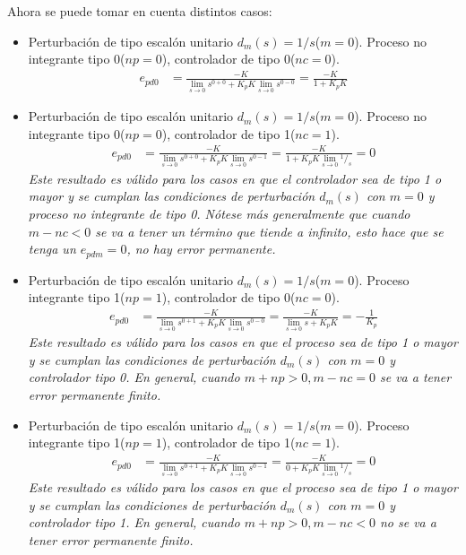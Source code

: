 \begin{ejercicio}
\begin{enumerate}
    Ahora se puede tomar en cuenta distintos casos:
    \begin{itemize}
      \item Perturbación de tipo escalón unitario $d_m(s)=1/s$($m=0$). Proceso no integrante tipo 0($np=0$), controlador de tipo 0($nc=0$).
      \begin{align*}
        e_{pd0} &= \frac{-K}
        {\lim_{s\rightarrow 0}s^{0+0} + K_p K\lim_{s\rightarrow 0} s^{0-0}}
        = \frac{-K}{1 + K_p K}
      \end{align*}

      \item Perturbación de tipo escalón unitario $d_m(s)=1/s$($m=0$). Proceso no integrante tipo 0($np=0$), controlador de tipo 1($nc=1$).
      \begin{align*}
        e_{pd0} &= \frac{-K}
        {\lim_{s\rightarrow 0}s^{0+0} + K_p K\lim_{s\rightarrow 0} s^{0-1}}
        =
        \frac{-K}
        {1 + K_p K\lim_{s\rightarrow 0} {^1/_s}}
        =
        0
      \end{align*}
      \textit{Este resultado es válido para los casos en que el controlador sea de tipo 1 o mayor y se cumplan las condiciones de perturbación $d_m(s)$ con $m=0$ y proceso no integrante de tipo 0. Nótese más generalmente que cuando $m-nc<0$ se va a tener un término que tiende a infinito, esto hace que se tenga un $e_{pdm} = 0$, no hay error permanente.}

      \item
      Perturbación de tipo escalón unitario $d_m(s)=1/s$($m=0$). Proceso integrante tipo 1($np=1$), controlador de tipo 0($nc=0$).
      \begin{align*}
        e_{pd0} &= \frac{-K}
        {\lim_{s\rightarrow 0}s^{0+1} + K_p K\lim_{s\rightarrow 0} s^{0-0}}
        =
        \frac{-K}
        {\lim_{s\rightarrow 0}s + K_p K}
        =
        -\frac{1}{K_p}
      \end{align*}
      \textit{Este resultado es válido para los casos en que el proceso sea de tipo 1 o mayor y se cumplan las condiciones de perturbación $d_m(s)$ con $m=0$ y controlador tipo 0. En general, cuando $m+np>0, m-nc=0$ se va a tener error permanente finito.}

      \item
      Perturbación de tipo escalón unitario $d_m(s)=1/s$($m=0$). Proceso integrante tipo 1($np=1$), controlador de tipo 1($nc=1$).
      \begin{align*}
        e_{pd0} &= \frac{-K}
        {\lim_{s\rightarrow 0}s^{0+1} + K_p K\lim_{s\rightarrow 0} s^{0-1}}
        =
        \frac{-K}
        {0 + K_p K\lim_{s\rightarrow 0} {^1/_s}}
        =
        0
      \end{align*}
      \textit{Este resultado es válido para los casos en que el proceso sea de tipo 1 o mayor y se cumplan las condiciones de perturbación $d_m(s)$ con $m=0$ y controlador tipo 1. En general, cuando $m+np>0, m-nc<0$ no se va a tener error permanente finito.}


\end{itemize}
\end{enumerate}
\end{ejercicio}
